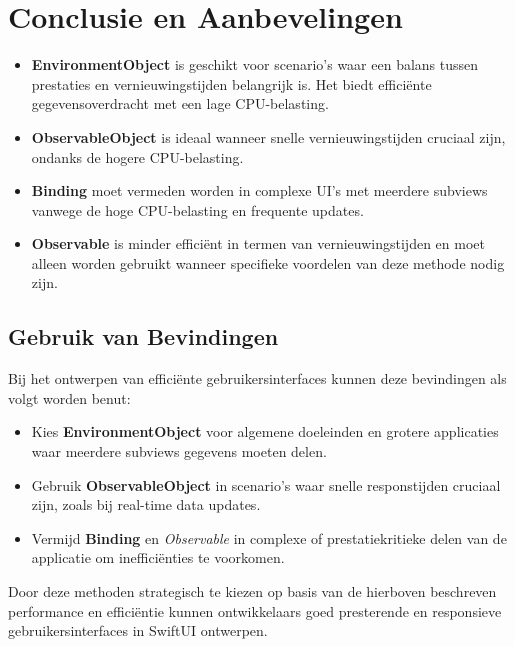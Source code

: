 \section{Conclusie en Aanbevelingen}
\begin{itemize}
    \item \textbf{EnvironmentObject} is geschikt voor scenario's waar een balans tussen prestaties en vernieuwingstijden belangrijk is. Het biedt efficiënte gegevensoverdracht met een lage CPU-belasting.
    \item \textbf{ObservableObject} is ideaal wanneer snelle vernieuwingstijden cruciaal zijn, ondanks de hogere CPU-belasting.
    \item \textbf{Binding} moet vermeden worden in complexe UI's met meerdere subviews vanwege de hoge CPU-belasting en frequente updates.
    \item \textbf{Observable} is minder efficiënt in termen van vernieuwingstijden en moet alleen worden gebruikt wanneer specifieke voordelen van deze methode nodig zijn.
\end{itemize}

\subsection{Gebruik van Bevindingen}
Bij het ontwerpen van efficiënte gebruikersinterfaces kunnen deze bevindingen als volgt worden benut:
\begin{itemize}
    \item Kies \textbf{EnvironmentObject} voor algemene doeleinden en grotere applicaties waar meerdere subviews gegevens moeten delen.
    \item Gebruik \textbf{ObservableObject} in scenario's waar snelle responstijden cruciaal zijn, zoals bij real-time data updates.
    \item Vermijd \textbf{Binding} en \textit{Observable} in complexe of prestatiekritieke delen van de applicatie om inefficiënties te voorkomen.
\end{itemize}

Door deze methoden strategisch te kiezen op basis van de hierboven beschreven performance en efficiëntie kunnen ontwikkelaars goed presterende en responsieve gebruikersinterfaces in SwiftUI ontwerpen.



